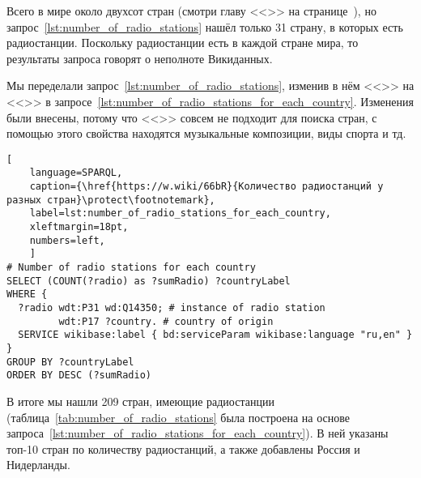 Всего в мире около двухсот стран (смотри главу <<>> на странице~\pageref{ch:RussiaNotCountryPPS}), но запрос~\ref{lst:number_of_radio_stations} нашёл только 31 страну, в которых есть радиостанции. Поскольку радиостанции есть в каждой стране мира, то результаты запроса говорят о неполноте Викиданных.

\newpage

Мы переделали запрос~\ref{lst:number_of_radio_stations}, изменив в нём <<>> на <<>> в запросе~\ref{lst:number_of_radio_stations_for_each_country}. Изменения были внесены, потому что <<>> совсем не подходит для поиска стран, с помощью этого свойства находятся музыкальные композиции, виды спорта и тд. 

\begin{lstlisting}[ 
    language=SPARQL,
    caption={\href{https://w.wiki/66bR}{Количество радиостанций у разных стран}\protect\footnotemark},
    label=lst:number_of_radio_stations_for_each_country,
    xleftmargin=18pt,
    numbers=left,
    ]
# Number of radio stations for each country 
SELECT (COUNT(?radio) as ?sumRadio) ?countryLabel
WHERE {
  ?radio wdt:P31 wd:Q14350; # instance of radio station
         wdt:P17 ?country. # country of origin
  SERVICE wikibase:label { bd:serviceParam wikibase:language "ru,en" }
}
GROUP BY ?countryLabel
ORDER BY DESC (?sumRadio)
\end{lstlisting}%


В итоге мы нашли \num{209} стран, имеющие радиостанции (таблица~\ref{tab:number_of_radio_stations} была построена на основе запроса~\ref{lst:number_of_radio_stations_for_each_country}). В ней указаны топ-10 стран по количеству радиостанций, а также добавлены Россия и Нидерланды.

